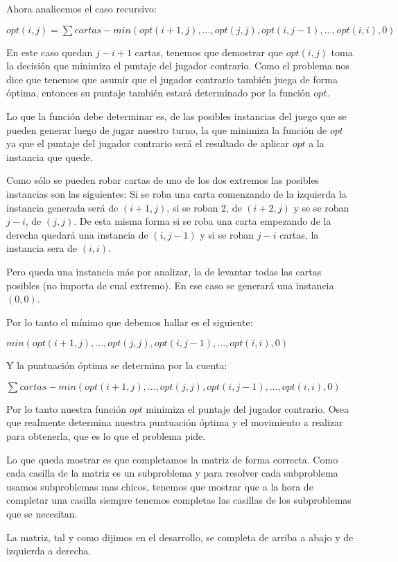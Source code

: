 Ahora analicemos el caso recursivo:

$opt(i,j) = \sum cartas - min(opt(i+1, j), ..., opt(j,j), opt(i, j-1), ... ,opt(i,i), 0)$

En este caso quedan $j-i+1$ cartas, tenemos que demostrar que $opt(i,j)$ toma la decisión que minimiza el puntaje del jugador contrario. Como el problema nos dice que tenemos que asumir que el jugador contrario también juega de forma óptima, entonces su puntaje también estará determinado por la función $opt$.

Lo que la función debe determinar es, de las posibles instancias del juego que se pueden generar luego de jugar nuestro turno, la que minimiza la función de $opt$ ya que el puntaje del jugador contrario será el resultado de aplicar $opt$ a la instancia que quede.

Como sólo se pueden robar cartas de uno de los dos extremos las posibles instancias son las siguientes: Si se roba una carta comenzando de la izquierda la instancia generada será de $(i+1,j)$, si se roban 2, de $(i+2,j)$ y se se roban $j-i$, de $(j,j)$. De esta misma forma si se roba una carta empezando de la derecha quedará una instancia de $(i,j-1)$ y si se roban $j-i$ cartas, la instancia sera de $(i,i)$.

Pero queda una instancia más por analizar, la de levantar todas las cartas posibles (no importa de cual extremo). En ese caso se generará una instancia $(0,0)$.

Por lo tanto el mínimo que debemos hallar es el siguiente:

$min(opt(i+1,j), ... , opt(j,j), opt(i,j-1), ... , opt(i,i), 0)$

Y la puntuación óptima se determina por la cuenta:

$\sum cartas - min(opt(i+1,j), ... , opt(j,j), opt(i,j-1), ... , opt(i,i), 0)$

Por lo tanto nuestra función $opt$ minimiza el puntaje del jugador contrario. Osea que realmente determina nuestra puntuación óptima y el movimiento a realizar para obtenerla, que es lo que el problema pide.

Lo que queda mostrar es que completamos la matriz de forma correcta. Como cada casilla de la matriz es un subproblema y para resolver cada subproblema usamos subproblemas mas chicos, tenemos que mostrar que a la hora de completar una casilla siempre tenemos completas las casillas de los subproblemas que se necesitan.

La matriz, tal y como dijimos en el desarrollo, se completa de arriba a abajo y de izquierda a derecha.

